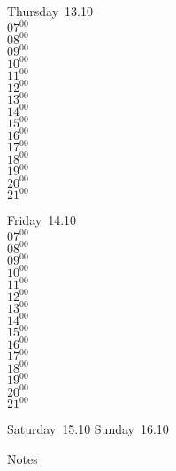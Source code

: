 \documentclass[11pt,a4paper]{book}\usepackage[]{graphicx}\usepackage[]{color}
\begin{document}
\clearpage
\begin{headerbox}
\end{headerbox}
\begin{weekdaybox}
  Thursday~13.10\\
  { 
  \vfill
  $07^{00}$\\
$08^{00}$\\
$09^{00}$\\
$10^{00}$\\
$11^{00}$\\
$12^{00}$\\
$13^{00}$\\
$14^{00}$\\
$15^{00}$\\
$16^{00}$\\
$17^{00}$\\
$18^{00}$\\
$19^{00}$\\
$20^{00}$\\
$21^{00}$\\
  }
\end{weekdaybox} 
\begin{weekdaybox}
  Friday~14.10\\
  { 
  \vfill
  $07^{00}$\\
$08^{00}$\\
$09^{00}$\\
$10^{00}$\\
$11^{00}$\\
$12^{00}$\\
$13^{00}$\\
$14^{00}$\\
$15^{00}$\\
$16^{00}$\\
$17^{00}$\\
$18^{00}$\\
$19^{00}$\\
$20^{00}$\\
$21^{00}$\\
  }
\end{weekdaybox}
\begin{weekendbox}
  Saturday~15.10
  \tcblower
  Sunday~16.10
\end{weekendbox} %
\begin{notebox}
  Notes
\end{notebox}
\clearpage
\end{document}
